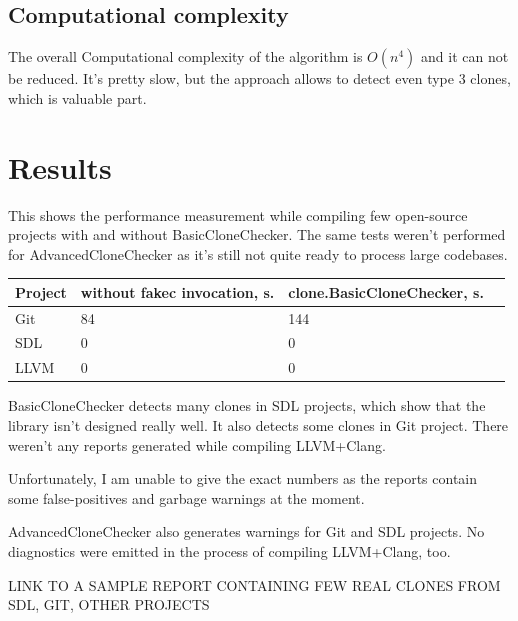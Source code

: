 \documentclass[a0,portrait]{a0poster}
\begin{document}
\begin{multicols}{2}
\subsection*{Computational complexity}

The overall Computational complexity of the algorithm is $O(n^4)$ and it can not be reduced. It's 
pretty slow, but the approach allows to detect even type 3 clones, which is valuable part.


\section*{Results}

This shows the performance measurement while compiling few open-source projects with and without
BasicCloneChecker. The same tests weren't performed for AdvancedCloneChecker as it's still not
quite ready to process large codebases.

\begin{center}\vspace{1cm}
\begin{tabular}{l l l l}
\toprule
\textbf{Project} & \textbf{without fakec invocation, s.} & \textbf{clone.BasicCloneChecker, s.}\\
\midrule
Git &  84 & 144 \\
SDL &  0  & 0   \\
LLVM & 0  & 0   \\
\bottomrule
\end{tabular}
\end{center}\vspace{1cm}

BasicCloneChecker detects many clones in SDL projects, which show that the library isn't designed
really well. It also detects some clones in Git project. There weren't any reports generated while
compiling LLVM+Clang.

Unfortunately, I am unable to give the exact numbers as the reports contain some false-positives
and garbage warnings at the moment.

AdvancedCloneChecker also generates warnings for Git and SDL projects. No diagnostics were emitted
in the process of compiling LLVM+Clang, too.

LINK TO A SAMPLE REPORT CONTAINING FEW REAL CLONES FROM SDL, GIT, OTHER PROJECTS


\end{multicols}
\end{document}
